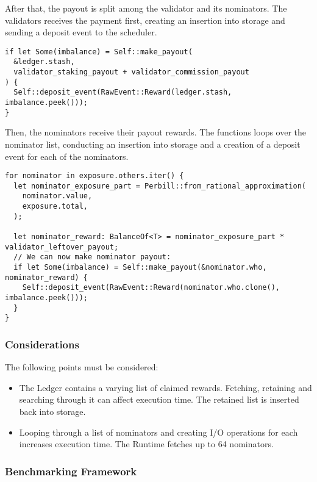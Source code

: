 \documentclass[11pt,a4paper]{article}
\begin{document}
After that, the payout is split among the validator and its nominators. The
validators receives the payment first, creating an insertion into storage and
sending a deposit event to the scheduler.

\begin{verbatim}
if let Some(imbalance) = Self::make_payout(
  &ledger.stash,
  validator_staking_payout + validator_commission_payout
) {
  Self::deposit_event(RawEvent::Reward(ledger.stash, imbalance.peek()));
}
\end{verbatim}

Then, the nominators receive their payout rewards. The functions loops over the
nominator list, conducting an insertion into storage and a creation of a deposit
event for each of the nominators.

\begin{verbatim}
for nominator in exposure.others.iter() {
  let nominator_exposure_part = Perbill::from_rational_approximation(
    nominator.value,
    exposure.total,
  );

  let nominator_reward: BalanceOf<T> = nominator_exposure_part * validator_leftover_payout;
  // We can now make nominator payout:
  if let Some(imbalance) = Self::make_payout(&nominator.who, nominator_reward) {
    Self::deposit_event(RawEvent::Reward(nominator.who.clone(), imbalance.peek()));
  }
}
\end{verbatim}

\subsubsection{Considerations}

The following points must be considered:

\begin{itemize}
  \item The Ledger contains a varying list of claimed rewards. Fetching,
  retaining and searching through it can affect execution time. The retained
  list is inserted back into storage.
  \item Looping through a list of nominators and creating I/O operations for
  each increases execution time. The Runtime fetches up to 64 nominators.
\end{itemize}

\subsubsection{Benchmarking Framework}
\end{document}
